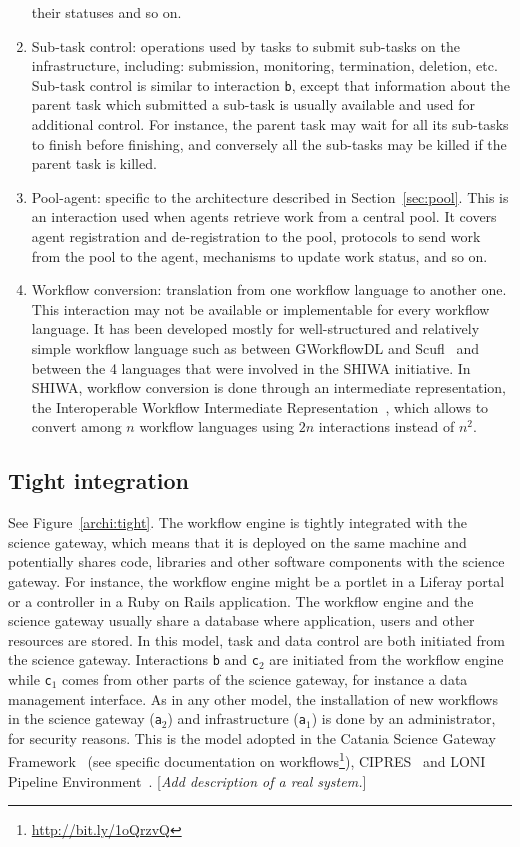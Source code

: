 \documentclass[preprint,3p,twocolumn]{elsarticle}
\newcommand{\todo}[1]{\color{blue}\xspace[\emph{#1}]\xspace\color{black}}
\begin{document}
\begin{enumerate}[leftmargin=0cm,itemindent=0.6cm,label=\texttt{(\alph*)}]
  their statuses and so on. 
\item Sub-task control: operations used by tasks to submit sub-tasks
  on the infrastructure, including: submission, monitoring,
  termination, deletion, etc. Sub-task control is similar to
  interaction \texttt{b}, except that information about the parent
  task which submitted a sub-task is usually available and used for
  additional control. For instance, the parent task may wait for all
  its sub-tasks to finish before finishing, and conversely all the
  sub-tasks may be killed if the parent task is killed.
\item Pool-agent: specific to the architecture described
  in Section~\ref{sec:pool}. This is an interaction used when agents retrieve
  work from a central pool. It covers agent registration and
  de-registration to the pool, protocols to send work from the pool to
  the agent, mechanisms to update work status, and so on. 
\item Workflow conversion: translation from one workflow language to
  another one. This interaction may not be available or implementable
  for every workflow language. It has been developed mostly for
  well-structured and relatively simple workflow language such as between GWorkflowDL
  and Scufl~\cite{OLAB-09} and between the 4 languages that were involved in the
  SHIWA initiative. In SHIWA, workflow conversion is done through an
  intermediate representation, the Interoperable Workflow Intermediate
  Representation~\cite{plankensteiner-montagnat-etal:2011}, which
  allows to convert among $n$ workflow languages using $2n$
  interactions instead of $n^2$.
\end{enumerate}


\subsection{Tight integration}

See Figure~\ref{archi:tight}. The workflow engine is tightly
integrated with the science gateway, which means that it is deployed
on the same machine and potentially shares code, libraries and other
software components with the science gateway. For instance, the
workflow engine might be a portlet in a Liferay portal or a controller
in a Ruby on Rails application. The workflow engine and the science
gateway usually share a database where application, users and other
resources are stored. In this model, task and data control are both
initiated from the science gateway. Interactions \texttt{b} and
\texttt{c$_2$} are initiated from the workflow engine while
\texttt{c$_1$} comes from other parts of the science gateway, for
instance a data management interface. As in any other model, the
installation of new workflows in the science gateway (\texttt{a$_2$})
and infrastructure (\texttt{a$_1$}) is done by an administrator, for
security reasons. This is the model adopted in the Catania Science
Gateway Framework~\cite{Ardizzone2012} (see specific documentation on
workflows\footnote{\url{http://bit.ly/1oQrzvQ}}),
CIPRES~\cite{miller2010creating} and LONI Pipeline
Environment~\cite{dinov2009efficient}.
\todo{Add description of a real system.}
\end{document}
